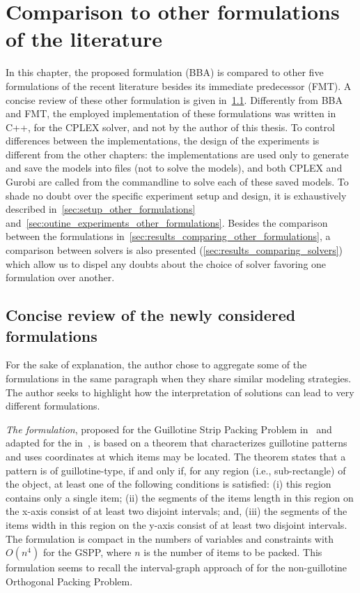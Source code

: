\chapter{Comparison to other formulations of the literature}

In this chapter, the proposed formulation (BBA) is compared to other five formulations of the recent literature besides its immediate predecessor (FMT).
A concise review of these other formulation is given in~\cref{sec:other_formulations}.
Differently from BBA and FMT, the employed implementation of these formulations was written in C++, for the CPLEX solver, and not by the author of this thesis.
To control differences between the implementations, the design of the experiments is different from the other chapters: the implementations are used only to generate and save the models into files (not to solve the models), and both CPLEX and Gurobi are called from the commandline to solve each of these saved models.
To shade no doubt over the specific experiment setup and design, it is exhaustively described in~\cref{sec:setup_other_formulations} and~\cref{sec:outine_experiments_other_formulations}.
Besides the comparison between the formulations in~\cref{sec:results_comparing_other_formulations}, a comparison between solvers is also presented (\cref{sec:results_comparing_solvers}) which allow us to dispel any doubts about the choice of solver favoring one formulation over another.

\section{Concise review of the newly considered formulations}
\label{sec:other_formulations}

For the sake of explanation, the author chose to aggregate some of the formulations in the same paragraph when they share similar modeling strategies.
The author seeks to highlight how the interpretation of solutions can lead to very different formulations.

\emph{The {\modelBCE} formulation}, proposed for the Guillotine Strip Packing Problem in~\citet{messaoud:2008} and adapted for the {\myproblem} in~\citet{martin:2020}, is based on a theorem that characterizes guillotine patterns and uses coordinates at which items may be located.
The theorem states that a pattern is of guillotine-type, if and only if, for any region (i.e., sub-rectangle) of the object, at least one of the following conditions is satisfied:
(i) this region contains only a single item;
(ii) the segments of the items length in this region on the x-axis consist of at least two disjoint intervals; and,
(iii) the segments of the items width in this region on the y-axis consist of at least two disjoint intervals.
The formulation is compact in the numbers of variables and constraints with \(O(n^4)\) for the GSPP, where $n$ is the number of items to be packed.
This formulation seems to recall the interval-graph approach of \citet{fekete:1997} for the non-guillotine Orthogonal Packing Problem.

